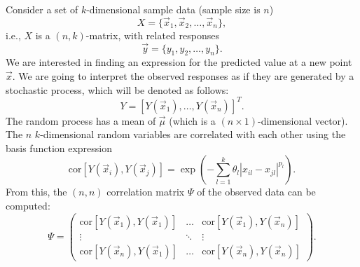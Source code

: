 \documentclass[
  letterpaper,
  DIV=11,
  numbers=noendperiod]{scrreprt}
\begin{document}
Consider a set of \(k\)-dimensional sample data (sample size is \(n\))
\[
X = \{\vec{x}_1, \vec{x}_2, \ldots, \vec{x}_n\},
\] i.e., \(X\) is a \((n,k)\)-matrix, with related responses \[
\vec{y} = \{y_1, y_2, \ldots, y_n\}.
\] We are interested in finding an expression for the predicted value at
a new point \(\vec{x}\). We are going to interpret the observed
responses as if they are generated by a stochastic process, which will
be denoted as follows: \[
Y = [Y(\vec{x}_1), \ldots, Y(\vec{x}_n) ]^T.
\] The random process has a mean of \(\vec{\mu}\) (which is a
\((n \times 1)\)-dimensional vector). The \(n\) \(k\)-dimensional random
variables are correlated with each other using the basis function
expression \[
\text{cor} [Y(\vec{x}_i), Y(\vec{x}_j)] =  \exp \left( - \sum_{l=1}^k \theta_l | x_{il} - x_{jl} | ^{p_l} \right).
\] From this, the \((n,n)\) correlation matrix \(\Psi\) of the observed
data can be computed: \[
\Psi = \begin{pmatrix}
\text{cor} [Y(\vec{x}_1), Y(\vec{x}_1)] & \ldots & \text{cor} [Y(\vec{x}_1), Y(\vec{x}_n)] \\ 
\vdots & \ddots & \vdots \\
 \text{cor} [Y(\vec{x}_n), Y(\vec{x}_1)] &  \ldots & \text{cor} [Y(\vec{x}_n), Y(\vec{x}_n)] 
 \end{pmatrix}.
 \]
\end{document}
